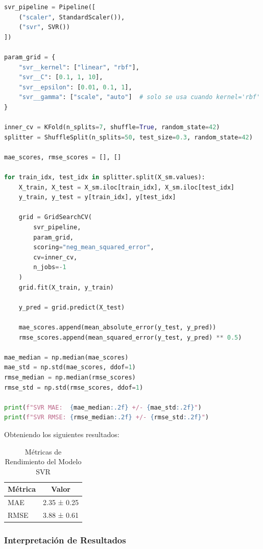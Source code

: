 \documentclass[12pt,a4paper]{article}
\begin{document}
\begin{lstlisting}[language=Python, frame=single, basicstyle=\ttfamily\small, breaklines=true]
svr_pipeline = Pipeline([
    ("scaler", StandardScaler()),
    ("svr", SVR())
])

param_grid = {
    "svr__kernel": ["linear", "rbf"],
    "svr__C": [0.1, 1, 10],
    "svr__epsilon": [0.01, 0.1, 1],
    "svr__gamma": ["scale", "auto"]  # solo se usa cuando kernel='rbf'
}

inner_cv = KFold(n_splits=7, shuffle=True, random_state=42)
splitter = ShuffleSplit(n_splits=50, test_size=0.3, random_state=42)

mae_scores, rmse_scores = [], []

for train_idx, test_idx in splitter.split(X_sm.values):
    X_train, X_test = X_sm.iloc[train_idx], X_sm.iloc[test_idx]
    y_train, y_test = y[train_idx], y[test_idx]

    grid = GridSearchCV(
        svr_pipeline,
        param_grid,
        scoring="neg_mean_squared_error",
        cv=inner_cv,
        n_jobs=-1
    )
    grid.fit(X_train, y_train)

    y_pred = grid.predict(X_test)

    mae_scores.append(mean_absolute_error(y_test, y_pred))
    rmse_scores.append(mean_squared_error(y_test, y_pred) ** 0.5)

mae_median = np.median(mae_scores)
mae_std = np.std(mae_scores, ddof=1)
rmse_median = np.median(rmse_scores)
rmse_std = np.std(rmse_scores, ddof=1)

print(f"SVR MAE:  {mae_median:.2f} +/- {mae_std:.2f}")
print(f"SVR RMSE: {rmse_median:.2f} +/- {rmse_std:.2f}")
\end{lstlisting}

Obteniendo los siguientes resultados:

\begin{table}[H]
\centering
\caption{Métricas de Rendimiento del Modelo SVR}\label{tab:svr_resultados}
\begin{tabular}{lc}
\toprule
\textbf{Métrica} & \textbf{Valor} \\
\midrule
MAE & 2.35 ± 0.25 \\
RMSE & 3.88 ± 0.61 \\
\bottomrule
\end{tabular}
\end{table}

\subsubsection{Interpretación de Resultados}
\end{document}
